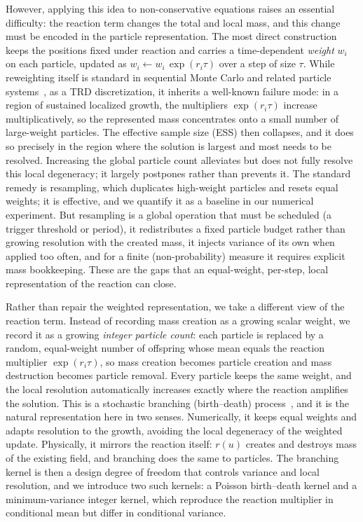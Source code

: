 \documentclass[a4paper,fleqn]{cas-sc}
\theoremstyle{definition}
\theoremstyle{remark}
\begin{document}
However, applying this idea to non-conservative equations raises an essential difficulty: the reaction term changes the total and local mass, and this change must be encoded in the particle representation. The most direct construction keeps the positions fixed under reaction and carries a time-dependent \emph{weight} $w_i$ on each particle, updated as $w_i \leftarrow w_i\,\exp(r_i\tau)$ over a step of size $\tau$. While reweighting itself is standard in sequential Monte Carlo and related particle systems~\cite{doucet2000sequential,liu1998sequential}, as a TRD discretization, it inherits a well-known failure mode: in a region of sustained localized growth, the multipliers $\exp(r_i\tau)$ increase multiplicatively, so the represented mass concentrates onto a small number of large-weight particles. The effective sample size (ESS) then collapses, and it does so precisely in the region where the solution is largest and most needs to be resolved. Increasing the global particle count alleviates but does not fully resolve this local degeneracy; it largely postpones rather than prevents it. The standard remedy is resampling, which duplicates high-weight particles and
resets equal weights; it is effective, and we quantify it as a baseline in our numerical experiment.
But resampling is a global operation that must be scheduled (a trigger threshold or period), it redistributes a
fixed particle budget rather than growing resolution with the created mass, it injects variance of its own when
applied too often, and for a finite (non-probability) measure it requires explicit mass bookkeeping. These are
the gaps that an equal-weight, per-step, local representation of the reaction can close.

Rather than repair the weighted representation, we take a different view of the reaction term. Instead of recording mass creation as a growing scalar weight, we record it as a growing \emph{integer particle count}: each particle is replaced by a random, equal-weight number of offspring whose mean equals the reaction multiplier $\exp(r_i\tau)$, so mass creation becomes particle creation and mass destruction becomes particle removal. Every particle keeps the same weight, and the local resolution automatically increases exactly where the reaction amplifies the solution. This is a stochastic branching (birth--death) process~\cite{harris1972nearest,bansaye2015stochastic}, and it is the natural representation here in two senses. Numerically, it keeps equal weights and adapts resolution to the growth, avoiding the local degeneracy of the weighted update. Physically, it mirrors the reaction itself: $r(u)$ creates and destroys mass of the existing field, and branching does the same to particles. The branching kernel is then a design degree of freedom that controls variance and local resolution, and we introduce two such kernels: a Poisson birth--death kernel and a minimum-variance integer kernel, which reproduce the reaction multiplier in conditional mean but differ in conditional variance.
\end{document}
